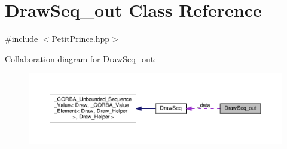 \hypertarget{class_draw_seq__out}{}\section{Draw\+Seq\+\_\+out Class Reference}
\label{class_draw_seq__out}


{\ttfamily \#include $<$Petit\+Prince.\+hpp$>$}



Collaboration diagram for Draw\+Seq\+\_\+out\+:
\nopagebreak
\begin{figure}[H]
\begin{center}
\leavevmode
\includegraphics[width=350pt]{class_draw_seq__out__coll__graph}
\end{center}
\end{figure}
